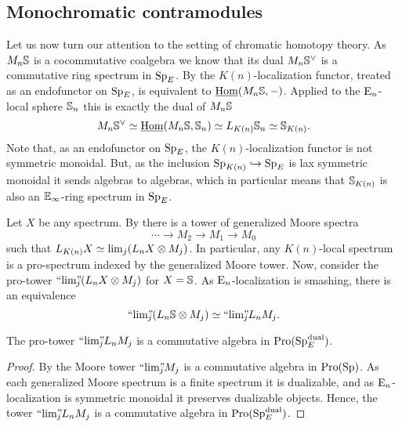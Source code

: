 \subsection{Monochromatic contramodules}

Let us now turn our attention to the setting of chromatic homotopy theory. As $M_n\S$ is a cocommutative coalgebra we know that its dual $M_n\S^\vee$ is a commutative ring spectrum in $\SpE$. By \cite[2.21(4)]{barthel-heard-valenzuela_2018} the $K(n)$-localization functor, treated as an endofunctor on $\SpE$, is equivalent to $\iHom(M_n\S,-)$. Applied to the $\En$-local sphere $\S_n$ this is exactly the dual of $M_n\S$
\[M_n \S^\vee \simeq \iHom(M_n\S, \S_n)\simeq L_\Kn \S_n \simeq \S_\Kn.\]
Note that, as an endofunctor on $\SpE$, the $K(n)$-localization functor is not symmetric monoidal. But, as the inclusion $\Sp_\Kn\hookrightarrow \SpE$ is lax symmetric monoidal it sends algebras to algebras, which in particular means that $\S_\Kn$ is also an $\E_\infty$-ring spectrum in $\SpE$. 

Let $X$ be any spectrum. By \cite[7.10]{hovey-strickland_99} there is a tower of generalized Moore spectra 
\[\cdots \to M_2 \to M_1 \to M_0\]
such that $L_\Kn X \simeq \lim_j (L_n X \otimes M_j)$. In particular, any $K(n)$-local spectrum is a pro-spectrum indexed by the generalized Moore tower. Now, consider the pro-tower $\prolim (L_n X \otimes M_j)$ for $X=\S$. As $\En$-localization is smashing, there is an equivalence 
\[\prolim (L_n \S \otimes M_j)\simeq \prolim L_n M_j.\]

\begin{lemma}
    \label{ch2:lm:Moore-tower-in-local-dualizable}
    The pro-tower $\prolim L_n M_j$ is a commutative algebra in $\Pro(\SpE\dual)$. 
\end{lemma}
\begin{proof}
    By \cite[6.3]{davis-lawson_2014} the Moore tower $\prolim M_j$ is a commutative algebra in $\Pro(\Sp)$. As each generalized Moore spectrum is a finite spectrum it is dualizable, and as $\En$-localization is symmetric monoidal it preserves dualizable objects. Hence, the tower $\prolim L_n M_j$ is a commutative algebra in $\Pro(\SpE\dual)$. 
\end{proof}

